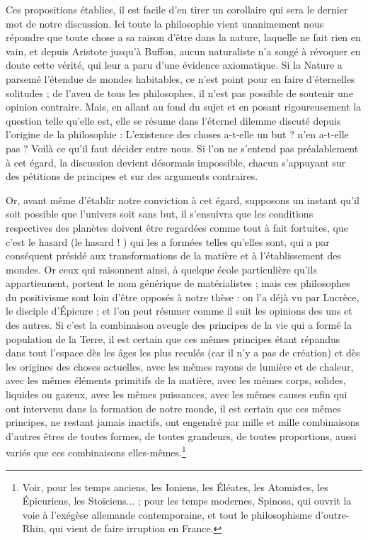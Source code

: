 \documentclass[a4paper, 11pt, oneside, landscape]{article}
\begin{document}
Ces propositions établies, il est facile d'en tirer un corollaire qui sera le dernier mot de notre discussion. Ici toute la philosophie vient unanimement nous répondre que toute chose a sa raison d'être dans la nature, laquelle ne fait rien en vain, et depuis Aristote jusqu'à Buffon, aucun naturaliste n'a songé à révoquer en doute cette vérité, qui leur a paru d'une évidence axiomatique. Si la Nature a parsemé l'étendue de mondes habitables, ce n'est point pour en faire d'éternelles solitudes ; de l'aveu de tous les philosophes, il n'est pas possible de soutenir une opinion contraire. Mais, en allant au fond du sujet et en posant rigoureusement la question telle qu'elle est, elle se résume dans l'éternel dilemme discuté depuis l'origine de la philosophie : L'existence des choses a-t-elle un but ? n'en a-t-elle pas ? Voilà ce qu'il faut décider entre nous. Si l'on ne s'entend pas préalablement à cet égard, la discussion devient désormais impossible, chacun s'appuyant sur des pétitions de principes et sur des arguments contraires.

Or, avant même d'établir notre conviction à cet égard, supposons un instant qu'il soit possible que l'univers soit sans but, il s'ensuivra que les conditions respectives des planètes doivent être regardées comme tout à fait fortuites, que c'est le hasard (le hasard ! ) qui les a formées telles qu'elles sont, qui a par conséquent présidé aux transformations de la matière et à l'établissement des mondes. Or ceux qui raisonnent ainsi, à quelque école particulière qu'ils appartiennent, portent le nom générique de matérialistes ; mais ces philosophes du positivisme sont loin d'être opposés à notre thèse : on l'a déjà vu par Lucrèce, le disciple d'Épicure ; et l'on peut résumer comme il suit les opinions des uns et des autres. Si c'est la combinaison aveugle des principes de la vie qui a formé la population de la Terre, il est certain que ces mêmes principes étant répandus dans tout l'espace dès les âges les plus reculés (car il n'y a pas de création) et dès les origines des choses actuelles, avec les mêmes rayons de lumière et de chaleur, avec les mêmes éléments primitifs de la matière, avec les mêmes corps, solides, liquides ou gazeux, avec les mêmes puissances, avec les mêmes causes enfin qui ont intervenu dans la formation de notre monde, il est certain que ces mêmes principes, ne restant jamais inactifs, ont engendré par mille et mille combinaisons d'autres êtres de toutes formes, de toutes grandeurs, de toutes proportions, aussi variés que ces combinaisons elles-mêmes.\footnote{Voir, pour les temps anciens, les Ioniens, les Éléates, les Atomistes, les Épicuriens, les Stoïciens... ; pour les temps modernes, Spinosa, qui ouvrit la voie à l'exégèse allemande contemporaine, et tout le philosophisme d'outre-Rhin, qui vient de faire irruption en France.}
\end{document}
